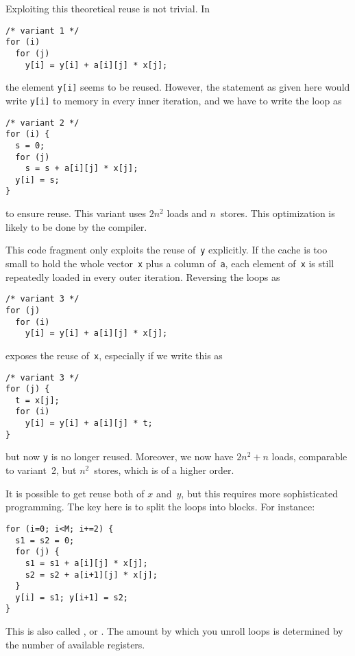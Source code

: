 Exploiting this theoretical reuse is not trivial. In
\begin{lstlisting}
/* variant 1 */
for (i)
  for (j)
    y[i] = y[i] + a[i][j] * x[j];
\end{lstlisting}
the element \texttt{y[i]} seems to be reused. However, the statement
as given here would write \texttt{y[i]} to memory in every inner
iteration, and we have to write the loop as
\begin{lstlisting}
/* variant 2 */
for (i) {
  s = 0;
  for (j)
    s = s + a[i][j] * x[j];
  y[i] = s;
}
\end{lstlisting}
to ensure reuse. This variant uses $2n^2$ loads and $n$~stores.
This optimization is likely to be done by the compiler.

This code fragment only exploits the reuse
of~\texttt{y} explicitly. If the cache is too small to hold the whole
vector~\texttt{x} plus a column of~\texttt{a}, each element
of~\texttt{x} is still repeatedly loaded in every outer iteration.
%
Reversing the loops as
\begin{lstlisting}
/* variant 3 */
for (j)
  for (i)
    y[i] = y[i] + a[i][j] * x[j];
\end{lstlisting}
exposes the reuse of~\texttt{x}, especially if we write this as
\begin{lstlisting}
/* variant 3 */
for (j) {
  t = x[j];
  for (i)
    y[i] = y[i] + a[i][j] * t;
}
\end{lstlisting}
but now \texttt{y} is no longer
reused. Moreover, we now have $2n^2+n$ loads, comparable to variant~2,
but $n^2$~stores, which is of a higher order.

It is possible to get reuse both of $x$ and~$y$, but this requires
more sophisticated programming. The key here is to split the loops into
blocks. For instance:
\begin{lstlisting}
for (i=0; i<M; i+=2) {
  s1 = s2 = 0;
  for (j) {
    s1 = s1 + a[i][j] * x[j];
    s2 = s2 + a[i+1][j] * x[j];
  }
  y[i] = s1; y[i+1] = s2;
}
\end{lstlisting}
This is also called ,
or . The amount by which you unroll
loops is determined by the number of available registers.





\endinput

C clock()

gettimeofday, getrusage

very accurate counters

PAPI, TAU
